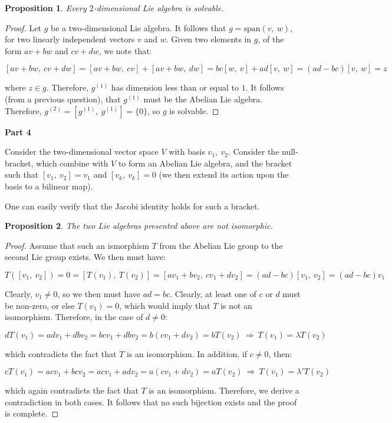 \documentclass[10pt, oneside]{article}
\newtheorem{prop}{Proposition}
\begin{document}
    \begin{prop}
      Every $2$-dimensional Lie algebra is solvable.
    \end{prop}

    \begin{proof}
      Let $g$ be a two-dimensional Lie algebra. It follows that $g = \text{span}(v, \ w)$, for two linearly independent vectors $v$ and $w$.
      Given two elements in $g$, of the form $av + bw$ and $cv + dw$, we note that:

      $$[av + bw, \ cv + dw] = [av + bw, \ cv] + [av + bw, \ dw] = bc[w, \ v] + ad[v, \ w] = (ad - bc)[v, \ w] = z$$

      where $z \in g$. Therefore, $g^{(1)}$ has dimension less than or equal to $1$. It follows (from a previous question), that $g^{(1)}$ must be the Abelian Lie algebra. Therefore,
      $g^{(2)} = [g^{(1)}, \ g^{(1)}] = \{0\}$, so $g$ is solvable.
    \end{proof}

    \textbf{Part 4}
    \newline

    Consider the two-dimensional vector space $V$ with basis $v_1, \ v_2$. Consider the null-bracket, which combine with $V$ to form an Abelian Lie algebra,
    and the bracket such that $[v_1, \ v_2] = v_1$ and $[v_k, \ v_k] = 0$ (we then extend its action upon the basis to a bilinear map).
    \newline

    One can easily verify
    that the Jacobi identity holds for such a bracket.
    \newline

    \begin{prop}
      The two Lie algebras presented above are not isomorphic.
    \end{prop}

    \begin{proof}
      Assume that such an ismorphism $T$ from the Abelian Lie group to the second Lie group exists. We then must have:

      $$T([v_1, \ v_2]) = 0 = [T(v_1), \ T(v_2)] = [av_1 + bv_2, \ cv_1 + dv_2] = (ad - bc)[v_1, \ v_2] = (ad - bc)v_1$$

      Clearly, $v_1 \neq 0$, so we then must have $ad = bc$. Clearly, at least one of $c$ or $d$ must be non-zero, or else $T(v_1) = 0$, which would imply that $T$ is not an isomorphism.
      Therefore, in the case of $d \neq 0$:

      $$d T(v_1) = ad v_1 + db v_2 = bc v_1 + db v_2 = b(cv_1 + dv_2) = b T(v_2) \ \Rightarrow \ T(v_1) = \lambda T(v_2)$$

      which contradicts the fact that $T$ is an isomorphism. In addition, if $c \neq 0$, then:

      $$c T(v_1) = ac v_1 + bc v_2 = ac v_1 + ad v_2 = a(cv_1 + dv_2) = a T(v_2) \ \Rightarrow \ T(v_1) = \lambda' T(v_2)$$

      which again contradicts the fact that $T$ is an isomorphism. Therefore, we derive a contradiction in both cases. It follows that no such
      bijection exists and the proof is complete.
      \end{proof}
\end{document}
